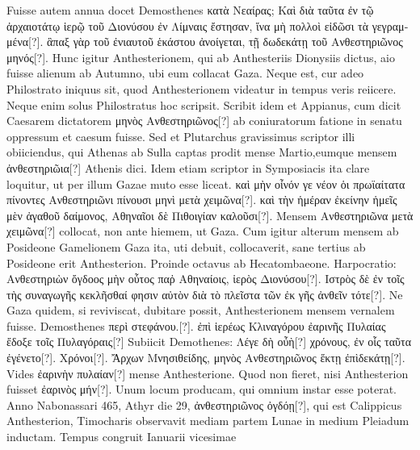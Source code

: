 Fuisse autem annua docet Demosthenes
\textgreek{κατὰ Νεαίρας;
 Καὶ διὰ ταῦτα ἐν τῷ ἀρχαιοτάτῳ ἱερῷ τοῦ Διονύσου ἐν Λίμναις ἔστησαν,
ἵνα μὴ πολλοὶ εἰδῶσι τὰ γεγραμμένα[?]}.
\textgreek{ἃπαξ γὰρ τοῦ ἐνιαυτοῦ ἑκάστου ἀνοίγεται,
τῇ δωδεκάτῃ τοῦ Ανθεστηριῶνος μηνός[?]}.
Hunc igitur Anthesterionem, qui ab
Anthesteriis Dionysiis dictus, aio fuisse alienum ab Autumno, ubi
eum collacat Gaza.
Neque est, cur adeo Philostrato iniquus sit, quod
Anthesterionem videatur in tempus veris reiicere.
Neque enim solus
Philostratus hoc scripsit.
Scribit idem et Appianus, cum dicit Caesarem
dictatorem \textgreek{μηνὸς Ανθεστηριῶνος[?]} ab coniuratorum fatione in senatu
oppressum et caesum fuisse.
Sed et Plutarchus gravissimus scriptor illi
obiiciendus, qui Athenas ab Sulla captas prodit mense Martio,eumque
mensem \textgreek{ἀνθεστηριῶια[?]} Athenis dici.
Idem etiam scriptor in Symposiacis
ita clare loquitur, ut per illum Gazae muto esse liceat.
 \textgreek{καὶ μὴν οἶνόν
γε νέον ὁι πρωϊαίτατα πίνοντες Ανθεστηριῶνι πίνουσι μηνὶ μετὰ χειμῶνα[?]}.
\textgreek{καὶ τὴν ἡμέραν
ἐκείνην ἡμεῖς μὲν ἀγαθοῦ δαίμονος, Αθηναῖοι δὲ Πιθοιγίαν καλοῦσι[?]}.
Mensem
\textgreek{Ανθεστηριῶνα μετὰ χειμῶνα[?]} collocat, non ante hiemem, ut Gaza.
Cum
igitur alterum mensem ab Posideone Gamelionem Gaza ita, uti debuit,
collocaverit, sane tertius ab Posideone erit Anthesterion.
Proinde octavus
ab Hecatombaeone.
Harpocratio: \textgreek{Ανθεστηριὼν ὄγδοος μὴν οὗτος παῤ
Αθηναίοις, ἱερὸς Διονύσου[?]}.
\textgreek{Ιστρὸς δὲ ἐν τοῖς τὴς συναγωγῆς κεκλῆσθαί φησιν αὐτὸν
διὰ τὸ πλεῖστα τῶν ἐκ γῆς ἀνθεῖν τότε[?]}.
Ne Gaza quidem, si reviviscat, dubitare
possit, Anthesterionem mensem vernalem fuisse.
Demosthenes
\textgreek{περὶ στεφάνου.}[?].
%
\textgreek{ἐπὶ ἱερέως Κλιναγόρου ἐαρινῆς
 Πυλαίας ἔδοξε τοῖς Πυλαγόραις[?]}
Subiicit Demothenes:
 \textgreek{Λέγε δὴ οὖὴ[?] χρόνους, ἐν οἷς ταῦτα ἐγένετο}[?].
\textgreek{Χρόνοι}[?].
\textgreek{Ἄρχων
Μνησιθείδης, μηνὸς Ανθεστηριῶνος ἕκτῃ ἐπὶδεκάτῃ[?]}.
Vides \textgreek{ἐαρινὴν πυλαίαν[?]}
mense Anthesterione.
Quod non fieret, nisi Anthesterion fuisset \textgreek{ἐαρινὸς
μήν[?]}.
Unum locum producam, qui omnium instar esse poterat.
Anno
Nabonassari 465, Athyr die 29, \textgreek{ἀνθεστηριῶνος ὀγδόῃ[?]},
 qui est Calippicus
Anthesterion, Timocharis observavit mediam partem Lunae in
medium Pleiadum inductam.
Tempus congruit Ianuarii vicesimae
